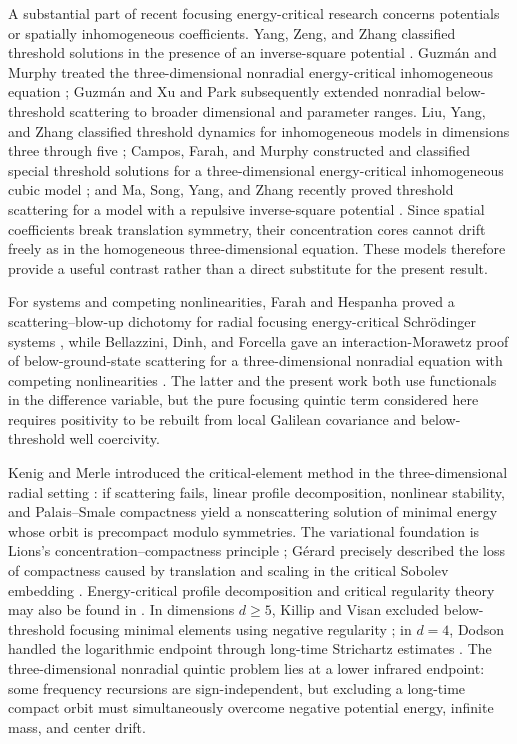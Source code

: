 \documentclass{interact}
\numberwithin{equation}{section}
\theoremstyle{plain}
\theoremstyle{definition}
\theoremstyle{remark}
\begin{document}
A substantial part of recent focusing energy-critical research concerns potentials or spatially inhomogeneous coefficients. Yang, Zeng, and Zhang classified threshold solutions in the presence of an inverse-square potential \cite{YangZengZhang2020}. Guzm\'an and Murphy treated the three-dimensional nonradial energy-critical inhomogeneous equation \cite{GuzmanMurphy2021}; Guzm\'an and Xu \cite{GuzmanXu2024} and Park \cite{Park2024} subsequently extended nonradial below-threshold scattering to broader dimensional and parameter ranges. Liu, Yang, and Zhang classified threshold dynamics for inhomogeneous models in dimensions three through five \cite{LiuYangZhang2024}; Campos, Farah, and Murphy constructed and classified special threshold solutions for a three-dimensional energy-critical inhomogeneous cubic model \cite{CamposFarahMurphy2026}; and Ma, Song, Yang, and Zhang recently proved threshold scattering for a model with a repulsive inverse-square potential \cite{MaSongYangZhang2026}. Since spatial coefficients break translation symmetry, their concentration cores cannot drift freely as in the homogeneous three-dimensional equation. These models therefore provide a useful contrast rather than a direct substitute for the present result.

For systems and competing nonlinearities, Farah and Hespanha proved a scattering--blow-up dichotomy for radial focusing energy-critical Schr\"odinger systems \cite{FarahHespanha2025}, while Bellazzini, Dinh, and Forcella gave an interaction-Morawetz proof of below-ground-state scattering for a three-dimensional nonradial equation with competing nonlinearities \cite{BellazziniDinhForcella2022}. The latter and the present work both use functionals in the difference variable, but the pure focusing quintic term considered here requires positivity to be rebuilt from local Galilean covariance and below-threshold well coercivity.

Kenig and Merle introduced the critical-element method in the three-dimensional radial setting \cite{KenigMerle2006}: if scattering fails, linear profile decomposition, nonlinear stability, and Palais--Smale compactness yield a nonscattering solution of minimal energy whose orbit is precompact modulo symmetries. The variational foundation is Lions's concentration--compactness principle \cite{Lions1984I,Lions1984II}; G\'erard precisely described the loss of compactness caused by translation and scaling in the critical Sobolev embedding \cite{Gerard1998}. Energy-critical profile decomposition and critical regularity theory may also be found in \cite{BahouriGerard1999,Keraani2001,KillipVisan2013}. In dimensions $d\ge5$, Killip and Visan excluded below-threshold focusing minimal elements using negative regularity \cite{KillipVisan2010}; in $d=4$, Dodson handled the logarithmic endpoint through long-time Strichartz estimates \cite{Dodson2019}. The three-dimensional nonradial quintic problem lies at a lower infrared endpoint: some frequency recursions are sign-independent, but excluding a long-time compact orbit must simultaneously overcome negative potential energy, infinite mass, and center drift.
\end{document}
